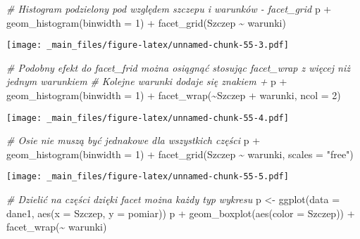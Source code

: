 \documentclass[
]{book}
\newenvironment{Shaded}{\begin{snugshade}}{\end{snugshade}}
\newcommand{\AttributeTok}[1]{\textcolor[rgb]{0.77,0.63,0.00}{#1}}
\newcommand{\CommentTok}[1]{\textcolor[rgb]{0.56,0.35,0.01}{\textit{#1}}}
\newcommand{\DecValTok}[1]{\textcolor[rgb]{0.00,0.00,0.81}{#1}}
\newcommand{\FunctionTok}[1]{\textcolor[rgb]{0.00,0.00,0.00}{#1}}
\newcommand{\NormalTok}[1]{#1}
\newcommand{\OtherTok}[1]{\textcolor[rgb]{0.56,0.35,0.01}{#1}}
\newcommand{\SpecialCharTok}[1]{\textcolor[rgb]{0.00,0.00,0.00}{#1}}
\newcommand{\StringTok}[1]{\textcolor[rgb]{0.31,0.60,0.02}{#1}}
\begin{document}
\begin{Shaded}
\begin{Highlighting}[]
\CommentTok{\# Histogram podzielony pod względem szczepu i warunków {-} facet\_grid}
\NormalTok{p }\SpecialCharTok{+} \FunctionTok{geom\_histogram}\NormalTok{(}\AttributeTok{binwidth =} \DecValTok{1}\NormalTok{) }\SpecialCharTok{+} \FunctionTok{facet\_grid}\NormalTok{(Szczep }\SpecialCharTok{\textasciitilde{}}\NormalTok{ warunki)}
\end{Highlighting}
\end{Shaded}

\texttt{[image: \_main\_files/figure-latex/unnamed-chunk-55-3.pdf]}

\begin{Shaded}
\begin{Highlighting}[]
\CommentTok{\# Podobny efekt do facet\_frid można osiągnąć stosując facet\_wrap z więcej niż jednym warunkiem}
\CommentTok{\# Kolejne warunki dodaje się znakiem +}
\NormalTok{p }\SpecialCharTok{+} \FunctionTok{geom\_histogram}\NormalTok{(}\AttributeTok{binwidth =} \DecValTok{1}\NormalTok{) }\SpecialCharTok{+} \FunctionTok{facet\_wrap}\NormalTok{(}\SpecialCharTok{\textasciitilde{}}\NormalTok{Szczep }\SpecialCharTok{+}\NormalTok{ warunki, }\AttributeTok{ncol =} \DecValTok{2}\NormalTok{)}
\end{Highlighting}
\end{Shaded}

\texttt{[image: \_main\_files/figure-latex/unnamed-chunk-55-4.pdf]}

\begin{Shaded}
\begin{Highlighting}[]
\CommentTok{\# Osie nie muszą być jednakowe dla wszystkich części}
\NormalTok{p }\SpecialCharTok{+} \FunctionTok{geom\_histogram}\NormalTok{(}\AttributeTok{binwidth =} \DecValTok{1}\NormalTok{) }\SpecialCharTok{+} \FunctionTok{facet\_grid}\NormalTok{(Szczep }\SpecialCharTok{\textasciitilde{}}\NormalTok{ warunki, }\AttributeTok{scales =} \StringTok{"free"}\NormalTok{)}
\end{Highlighting}
\end{Shaded}

\texttt{[image: \_main\_files/figure-latex/unnamed-chunk-55-5.pdf]}

\begin{Shaded}
\begin{Highlighting}[]
\CommentTok{\# Dzielić na części dzięki facet można każdy typ wykresu}
\NormalTok{p }\OtherTok{\textless{}{-}} \FunctionTok{ggplot}\NormalTok{(}\AttributeTok{data =}\NormalTok{ dane1, }\FunctionTok{aes}\NormalTok{(}\AttributeTok{x =}\NormalTok{ Szczep, }\AttributeTok{y =}\NormalTok{ pomiar))}
\NormalTok{p }\SpecialCharTok{+} \FunctionTok{geom\_boxplot}\NormalTok{(}\FunctionTok{aes}\NormalTok{(}\AttributeTok{color =}\NormalTok{ Szczep)) }\SpecialCharTok{+} \FunctionTok{facet\_wrap}\NormalTok{(}\SpecialCharTok{\textasciitilde{}}\NormalTok{ warunki)}
\end{Highlighting}
\end{Shaded}
\end{document}
